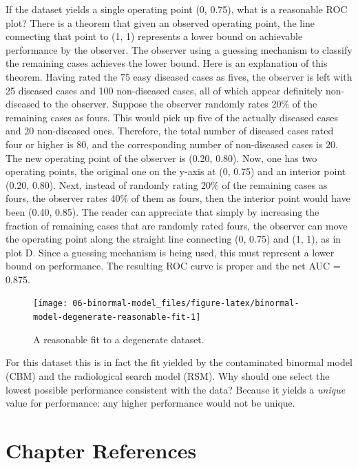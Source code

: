 \documentclass[
]{book}
\begin{document}
If the dataset yields a single operating point (0, 0.75), what is a reasonable ROC plot? There is a theorem that given an observed operating point, the line connecting that point to (1, 1) represents a lower bound on achievable performance by the observer. The observer using a guessing mechanism to classify the remaining cases achieves the lower bound. Here is an explanation of this theorem. Having rated the 75 easy diseased cases as fives, the observer is left with 25 diseased cases and 100 non-diseased cases, all of which appear definitely non-diseased to the observer. Suppose the observer randomly rates 20\% of the remaining cases as fours. This would pick up five of the actually diseased cases and 20 non-diseased ones. Therefore, the total number of diseased cases rated four or higher is 80, and the corresponding number of non-diseased cases is 20. The new operating point of the observer is (0.20, 0.80). Now, one has two operating points, the original one on the y-axis at (0, 0.75) and an interior point (0.20, 0.80). Next, instead of randomly rating 20\% of the remaining cases as fours, the observer rates 40\% of them as fours, then the interior point would have been (0.40, 0.85). The reader can appreciate that simply by increasing the fraction of remaining cases that are randomly rated fours, the observer can move the operating point along the straight line connecting (0, 0.75) and (1, 1), as in plot D. Since a guessing mechanism is being used, this must represent a lower bound on performance. The resulting ROC curve is proper and the net AUC = 0.875.

\begin{figure}

{\centering \texttt{[image: 06-binormal-model\_files/figure-latex/binormal-model-degenerate-reasonable-fit-1]} 

}

\caption{A reasonable fit to a degenerate dataset.}\label{fig:binormal-model-degenerate-reasonable-fit}
\end{figure}

For this dataset this is in fact the fit yielded by the contaminated binormal model (CBM) and the radiological search model (RSM). Why should one select the lowest possible performance consistent with the data? Because it yields a \emph{unique} value for performance: any higher performance would not be unique.

\hypertarget{binormal-model-references}{%
\section{Chapter References}\label{binormal-model-references}}
\end{document}
